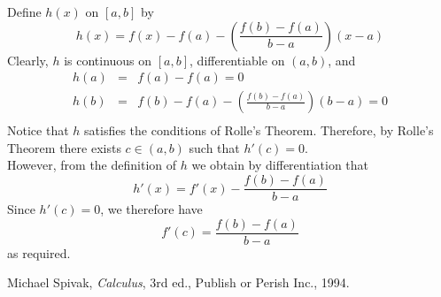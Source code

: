 \documentclass[12pt]{article}
\begin{document}
Define $h(x)$ on $[a,b]$ by
\[ h(x) = f(x) - f(a) - \left( \frac{f(b)-f(a)}{b-a} \right) (x-a) \]
Clearly, $h$ is continuous on $[a,b]$, differentiable on $(a, b)$, and
\[ \begin{array}{ccl}
h(a) & = & f(a)-f(a)=0 \\
h(b) & = & f(b)-f(a)-\left( \frac{f(b)-f(a)}{b-a}\right)(b-a) = 0\\
\end{array} \]
Notice that $h$ satisfies the conditions of Rolle's Theorem.  Therefore, by Rolle's Theorem there exists $c \in (a,b)$ such that $h'(c)=0$.\\
%
However, from the definition of $h$ we obtain by differentiation that
\[ h'(x) = f'(x) - \frac{f(b)-f(a)}{b-a} \]
Since $h'(c)=0$, we therefore have
\[ f'(c) = \frac{f(b)-f(a)}{b-a} \]
as required.

\begin{thebibliography}{1}
 Michael Spivak, {\em Calculus}, 3rd ed., Publish or Perish Inc., 1994. 
\end{thebibliography}
\end{document}

